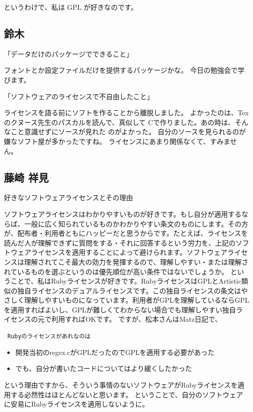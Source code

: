 \documentclass[mingoth,a4paper]{jsarticle}
\begin{document}
\begin{multicols}{2}
{というわけで、私は GPL が好きなのです。


\subsection{鈴木}

「データだけのパッケージでできること」

フォントとか設定ファイルだけを提供するパッケージかな。
今日の勉強会で学びます。

「ソフトウェアのライセンスで不自由したこと」

ライセンスを語る前にソフトを作ることから離脱しました。
よかったのは、Texのクヌース先生のパスカルを読んで、真似して
Cで作りました。あの時は、そんなこと意識せずにソースが見れた
のがよかった。
自分のソースを見られるのが嫌なソフト屋が多かったですね。
ライセンスにあまり関係なくて、すみません。

\subsection{藤崎 祥見}


好きなソフトウェアライセンスとその理由

ソフトウェアライセンスはわかりやすいものが好きです。もし自分が適用するならば、一般に広く知られているものかわかりやすい条文のものにします。その方が、配布者・利用者ともにハッピーだと思うからです。たとえば、ライセンスを読んだ人が理解できずに質問をする・それに回答するという労力を、上記のソフトウェアライセンスを適用することによって避けられます。ソフトウェアライセンスは理解されてこそ最大の効力を発揮するので、理解しやすい・または理解されているものを選ぶというのは優先順位が高い条件ではないでしょうか。
ということで、私はRubyライセンスが好きです。RubyライセンスはGPLとArtistic類似の独自ライセンスのデュアルライセンスです。この独自ライセンスの条文はやさしく理解しやすいものになっています。利用者がGPLを理解しているならGPLを適用すればよいし、GPLが難しくてわからない場合でも理解しやすい独自ライセンスの元で利用すればOKです。
ですが、松本さんはMatz日記で、

{\tt
 Rubyのライセンスがあれなのは
\begin{itemize}
 \item  開発当初のregex.cがGPLだったのでGPLを適用する必要があった
 \item  でも、自分が書いたコードについてはより緩くしたかった
\end{itemize} 
という理由ですから、そういう事情のないソフトウェアがRubyライセンスを適用する必然性はほとんどないと思います。
 ということで、自分のソフトウェアに安易にRubyライセンスを適用しないように。
}

}
\end{multicols}
\end{document}
